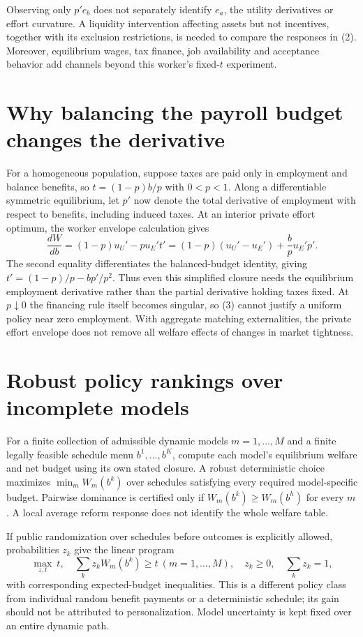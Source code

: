 \documentclass[11pt]{article}
\begin{document}
Observing only $p'e_b$ does not separately identify $e_a$, the utility derivatives or effort curvature. A liquidity intervention affecting assets but not incentives, together with its exclusion restrictions, is needed to compare the responses in (2). Moreover, equilibrium wages, tax finance, job availability and acceptance behavior add channels beyond this worker's fixed-$t$ experiment.

\section*{Why balancing the payroll budget changes the derivative}
For a homogeneous population, suppose taxes are paid only in employment and balance benefits, so $t=(1-p)b/p$ with $0<p<1$. Along a differentiable symmetric equilibrium, let $p'$ now denote the total derivative of employment with respect to benefits, including induced taxes. At an interior private effort optimum, the worker envelope calculation gives
\[
 \frac{dW}{db}=(1-p)u_U'-pu_E't'
 =(1-p)(u_U'-u_E')+\frac bp u_E'p'. \tag{3}
\]
The second equality differentiates the balanced-budget identity, giving
$t'=(1-p)/p-bp'/p^2$. Thus even this simplified closure needs the equilibrium employment derivative rather than the partial derivative holding taxes fixed. At $p\downarrow0$ the financing rule itself becomes singular, so (3) cannot justify a uniform policy near zero employment. With aggregate matching externalities, the private effort envelope does not remove all welfare effects of changes in market tightness.

\section*{Robust policy rankings over incomplete models}
For a finite collection of admissible dynamic models $m=1,\ldots,M$ and a finite legally feasible schedule menu $b^1,\ldots,b^K$, compute each model's equilibrium welfare and net budget using its own stated closure. A robust deterministic choice maximizes
$\min_m W_m(b^k)$ over schedules satisfying every required model-specific budget. Pairwise dominance is certified only if $W_m(b^k)\geq W_m(b^h)$ for every $m$. A local average reform response does not identify the whole welfare table.

If public randomization over schedules before outcomes is explicitly allowed, probabilities $z_k$ give the linear program
\[
 \max_{z,t}\ t,\quad \sum_kz_kW_m(b^k)\geq t\ (m=1,\ldots,M),
 \quad z_k\geq0,\quad\sum_kz_k=1,
\]
with corresponding expected-budget inequalities. This is a different policy class from individual random benefit payments or a deterministic schedule; its gain should not be attributed to personalization. Model uncertainty is kept fixed over an entire dynamic path.
\end{document}
